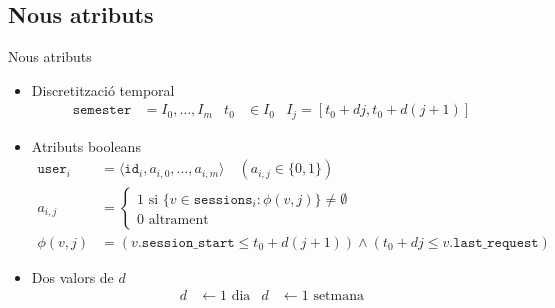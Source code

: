 \documentclass[xcolor=x11names,
								compress,
								aspectratio=1610]{beamer}
\newcommand{\mt}[1]{\texttt{#1}}
\theoremstyle{definition}%
\renewcommand{\(}{\begin{columns}}
\renewcommand{\)}{\end{columns}}
\newcommand{\<}[1]{\begin{column}{#1}}
\renewcommand{\>}{\end{column}}
\begin{document}
\subsection{Nous atributs}
\begin{frame}{Nous atributs}
	\begin{itemize}
	\item Discretització temporal
	\begin{align*}
		\mt{semester} & = I_0, \ldots, I_m
		&
		t_0 & \in I_0 
		& 
		I_j = [t_0 + dj, t_0 + d(j+1)]
	\end{align*}
	\item Atributs booleans
	\begin{align*}
		\mt{user}_i & = \langle \mt{id}_i, a_{i,0},\ldots,a_{i,m} \rangle
		\quad (a_{i,j}  \in \{0,1\}) \\
		a_{i,j} & = \begin{cases}
					1 \text{ si } \{v \in \mt{sessions}_i : \phi(v,j)  \} \neq \emptyset   \\
					0 \text{ altrament}
					\end{cases} \\
		\phi(v,j) & = (v.\mt{session\_start} \leq t_0 + d(j+1)) \wedge (t_0 + dj \leq v.\mt{last\_request})
	\end{align*}
	\item Dos valors de $d$
	\begin{align*}
	d & \leftarrow 1\text{ dia} & d & \leftarrow 1\text{ setmana}
	\end{align*}
	\end{itemize}
\end{frame}
\end{document}
